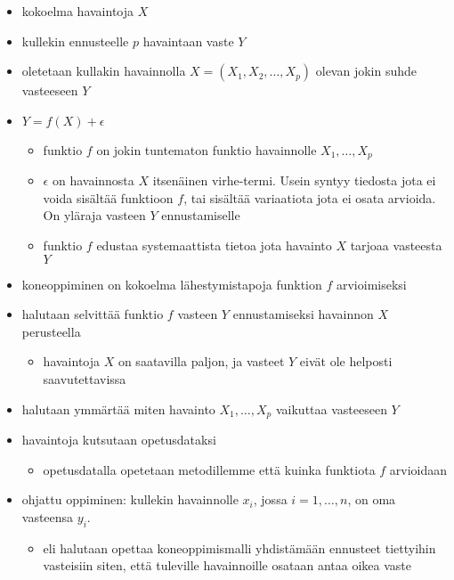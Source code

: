 \documentclass[finnish,twoside,openright]{HYgraduMLDS}
\begin{document}
\begin{itemize}
    \item kokoelma havaintoja $X$
    \item kullekin ennusteelle $p$ havaintaan vaste $Y$
    \item oletetaan kullakin havainnolla $X = (X_1, X_2, \dots, X_p)$ olevan jokin suhde vasteeseen $Y$
    \item $Y = f(X) + \epsilon$
    \begin{itemize}
        \item funktio $f$ on jokin tuntematon funktio havainnolle $X_1, \dots, X_p$
        \item $\epsilon$ on havainnosta $X$ itsenäinen virhe-termi. Usein syntyy tiedosta jota ei voida sisältää funktioon $f$, tai sisältää variaatiota jota ei osata arvioida. On yläraja vasteen $Y$ ennustamiselle
        \item funktio $f$ edustaa systemaattista tietoa jota havainto $X$ tarjoaa vasteesta $Y$
    \end{itemize}
    \item koneoppiminen on kokoelma lähestymistapoja funktion $f$ arvioimiseksi
    \item halutaan selvittää funktio $f$ vasteen $Y$ ennustamiseksi havainnon $X$ perusteella
    \begin{itemize}
        \item havaintoja $X$ on saatavilla paljon, ja vasteet $Y$ eivät ole helposti saavutettavissa
    \end{itemize}
    \item halutaan ymmärtää miten havainto $X_1, \dots, X_p$ vaikuttaa vasteeseen $Y$
    \item havaintoja kutsutaan opetusdataksi
    \begin{itemize}
        \item opetusdatalla opetetaan metodillemme että kuinka funktiota $f$ arvioidaan
    \end{itemize}
    \item ohjattu oppiminen: kullekin havainnolle $x_i$, jossa $i = 1, \dots, n$, on oma vasteensa $y_i$.
    \begin{itemize}
        \item eli halutaan opettaa koneoppimismalli yhdistämään ennusteet tiettyihin vasteisiin siten, että tuleville havainnoille osataan antaa oikea vaste
    \end{itemize}
\end{itemize}
\end{document}

